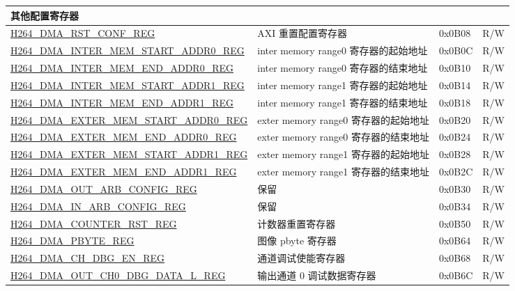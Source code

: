 \begin{longtable}{ | p{7.5cm} | p{5.7cm} | p{1.2cm} | p{1cm} | }
    \multicolumn{4}{|l|}{\textbf{其他配置寄存器}} \\ \hline
    \hyperref[regdesc:H264DMARSTCONFREG]{H264\_DMA\_RST\_CONF\_REG} & AXI 重置配置寄存器 & 0x0B08 & R/W \\ \hline
    \hyperref[regdesc:H264DMAINTERMEMSTARTADDR0REG]{H264\_DMA\_INTER\_MEM\_START\_ADDR0\_REG} & inter memory range0 寄存器的起始地址 & 0x0B0C & R/W \\ \hline
    \hyperref[regdesc:H264DMAINTERMEMENDADDR0REG]{H264\_DMA\_INTER\_MEM\_END\_ADDR0\_REG} & inter memory range0 寄存器的结束地址 & 0x0B10 & R/W \\ \hline
    \hyperref[regdesc:H264DMAINTERMEMSTARTADDR1REG]{H264\_DMA\_INTER\_MEM\_START\_ADDR1\_REG} & inter memory range1 寄存器的起始地址 & 0x0B14 & R/W \\ \hline
    \hyperref[regdesc:H264DMAINTERMEMENDADDR1REG]{H264\_DMA\_INTER\_MEM\_END\_ADDR1\_REG} & inter memory range1 寄存器的结束地址 & 0x0B18 & R/W \\ \hline
    \hyperref[regdesc:H264DMAEXTERMEMSTARTADDR0REG]{H264\_DMA\_EXTER\_MEM\_START\_ADDR0\_REG} & exter memory range0 寄存器的起始地址 & 0x0B20 & R/W \\ \hline
    \hyperref[regdesc:H264DMAEXTERMEMENDADDR0REG]{H264\_DMA\_EXTER\_MEM\_END\_ADDR0\_REG} & exter memory range0 寄存器的结束地址 & 0x0B24 & R/W \\ \hline
    \hyperref[regdesc:H264DMAEXTERMEMSTARTADDR1REG]{H264\_DMA\_EXTER\_MEM\_START\_ADDR1\_REG} & exter memory range1 寄存器的起始地址 & 0x0B28 & R/W \\ \hline
    \hyperref[regdesc:H264DMAEXTERMEMENDADDR1REG]{H264\_DMA\_EXTER\_MEM\_END\_ADDR1\_REG} & exter memory range1 寄存器的结束地址 & 0x0B2C & R/W \\ \hline
    \hyperref[regdesc:H264DMAOUTARBCONFIGREG]{H264\_DMA\_OUT\_ARB\_CONFIG\_REG} & 保留 & 0x0B30 & R/W \\ \hline
    \hyperref[regdesc:H264DMAINARBCONFIGREG]{H264\_DMA\_IN\_ARB\_CONFIG\_REG} & 保留 & 0x0B34 & R/W \\ \hline
    \hyperref[regdesc:H264DMACOUNTERRSTREG]{H264\_DMA\_COUNTER\_RST\_REG} & 计数器重置寄存器 & 0x0B50 & R/W \\ \hline
    \hyperref[regdesc:H264DMAPBYTEREG]{H264\_DMA\_PBYTE\_REG} & 图像 pbyte 寄存器 & 0x0B64 & R/W \\ \hline
    \hyperref[regdesc:H264DMACHDBGENREG]{H264\_DMA\_CH\_DBG\_EN\_REG} & 通道调试使能寄存器 & 0x0B68 & R/W \\ \hline
    \hyperref[regdesc:H264DMAOUTCH0DBGDATALREG]{H264\_DMA\_OUT\_CH0\_DBG\_DATA\_L\_REG} & 输出通道 0 调试数据寄存器 & 0x0B6C & R/W \\ \hline

\end{longtable}
